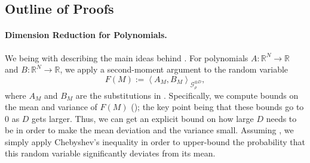 \documentclass[11pt]{article}
\newcommand{\Red}[1]{\textcolor{red}{#1}}
\newcommand{\inangle}[1]{\left \langle #1 \right \rangle}
\newcommand{\bbR}{{\mathbb R}}
\newcommand{\calG}{\mathcal{G}}
\begin{document}






\subsection{Outline of Proofs} \label{subsec:proof_outline}
\paragraph{Dimension Reduction for Polynomials.} We being with describing the main ideas behind . For polynomials $A : \bbR^N \to \bbR$ and $B : \bbR^N \to \bbR$, we apply a second-moment argument to the random variable
\[F(M) := \inangle{A_M, B_M}_{\calG_{\rho}^{\otimes D}},\]
where $A_M$ and $B_M$ are the substitutions in . Specifically, we compute bounds on the mean and variance of $F(M)$ (); the key point being that these bounds go to $0$ as $D$ gets larger. Thus, we can get an explicit bound on how large $D$ needs to be in order to make the mean deviation and the variance small. Assuming , we simply apply Chebyshev's inequality in order to upper-bound the probability that this random variable significantly deviates from its mean.
\end{document}
